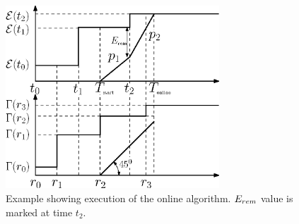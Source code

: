 \begin{figure}
\centering
  \centerline{\includegraphics[width=8cm]{online.eps}}
\caption{Example showing execution of the online algorithm. $E_{\mbox{\scriptsize{rem}}}$ value is marked at time $t_2$.}\label{figure_online_example}
\end{figure}


%
%

